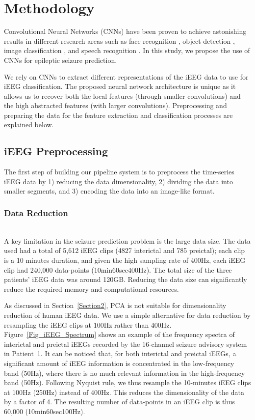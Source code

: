\documentclass[journal]{IEEEtran}
\begin{document}
\section{Methodology}
\label{Section3}

Convolutional Neural Networks (CNNs) have been proven to achieve astonishing results in different research areas such as face recognition \cite{Taigman}, object detection \cite{Erhan_2014_CVPR}, image classification \cite{Krizhevsky}, and speech recognition \cite{Graves}. In this study, we propose the use of CNNs for epileptic seizure prediction. 

We rely on CNNs to extract different representations of the iEEG data to use for iEEG classification. The proposed neural network architecture is unique as it allows us to recover both the local features (through smaller convolutions) and the high abstracted features (with larger convolutions). Preprocessing and preparing the data for the feature extraction and classification processes are explained below.

\subsection{iEEG Preprocessing}

The first step of building our pipeline system is to preprocess the time-series iEEG data by 1) reducing the data dimensionality, 2) dividing the data into smaller segments, and 3) encoding the data into an image-like format.

\subsubsection{Data Reduction} ~\\  
A key limitation in the seizure prediction problem is the large data size. The data used had a total of 5,612 iEEG clips (4827 interictal and 785 preictal); each clip is a 10 minutes duration, and given the high sampling rate of 400Hz, each iEEG clip had 240,000 data-points (10min60sec400Hz). The total size of the three patients' iEEG data was around 120GB. Reducing the data size can significantly reduce the required memory and computational resources.  

As discussed in Section~\ref{Section2}, PCA is not suitable for dimensionality reduction of human iEEG data. We use a simple alternative for data reduction by resampling the iEEG clips at 100Hz rather than 400Hz. Figure~\ref{Fig_iEEG_Spectrum} shows an example of the frequency spectra of interictal and preictal iEEGs recorded by the 16-channel seizure advisory system in Patient~1. It can be noticed that, for both interictal and preictal iEEGs, a significant amount of iEEG information is concentrated in the low-frequency band (50Hz), where there is no much relevant information in the high-frequency band (50Hz). Following Nyquist rule, we thus resample the 10-minutes iEEG clips at 100Hz (250Hz) instead of 400Hz. This reduces the dimensionality of the data by a factor of 4. The resulting number of data-points in an iEEG clip is thus 60,000 (10min60sec100Hz).
\end{document}
